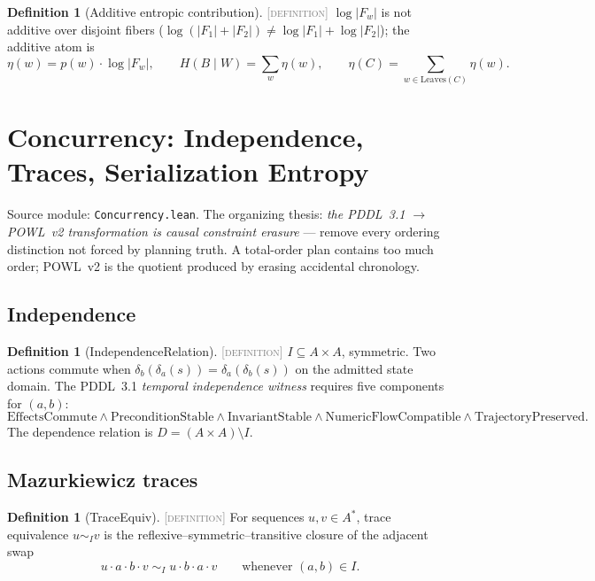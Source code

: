 \documentclass[11pt]{article}
\newcommand{\DEFINITION}{\textcolor{gray}{\textsc{[definition]}}}
\newcommand{\fib}[1]{F_{#1}}                   %
\newcommand{\traceEq}[1]{\sim_{#1}}            %
\theoremstyle{plain}
\theoremstyle{definition}
\newtheorem{definition}[theorem]{Definition}
\begin{document}
\begin{definition}[Additive entropic contribution]\DEFINITION\;
$\log|\fib{w}|$ is not additive over disjoint fibers
($\log(|F_1| + |F_2|) \ne \log|F_1| + \log|F_2|$); the additive atom is
\[
  \eta(w) = p(w)\cdot \log|\fib{w}|,
  \qquad
  H(B \mid W) = \sum_{w} \eta(w),
  \qquad
  \eta(C) = \sum_{w \in \mathrm{Leaves}(C)} \eta(w).
\]
\end{definition}

\section{Concurrency: Independence, Traces, Serialization Entropy}
\label{sec:concurrency}
Source module: \texttt{Concurrency.lean}. The organizing thesis:
\emph{the PDDL~3.1 $\to$ POWL~v2 transformation is causal constraint
erasure} --- remove every ordering distinction not forced by planning truth.
A total-order plan contains too much order; POWL~v2 is the quotient produced
by erasing accidental chronology.

\subsection{Independence}

\begin{definition}[IndependenceRelation]\DEFINITION\;
$I \subseteq A \times A$, symmetric. Two actions commute when
$\delta_b(\delta_a(s)) = \delta_a(\delta_b(s))$ on the admitted state
domain. The PDDL~3.1 \emph{temporal independence witness} requires five
components for $(a,b)$:
\[
  \mathrm{EffectsCommute} \wedge
  \mathrm{PreconditionStable} \wedge
  \mathrm{InvariantStable} \wedge
  \mathrm{NumericFlowCompatible} \wedge
  \mathrm{TrajectoryPreserved}.
\]
The dependence relation is $D = (A \times A) \setminus I$.
\end{definition}

\subsection{Mazurkiewicz traces}

\begin{definition}[TraceEquiv]\DEFINITION\;
For sequences $u, v \in A^{*}$, trace equivalence
$u \traceEq{I} v$ is the reflexive--symmetric--transitive closure of the
adjacent swap
\[
  u \cdot a \cdot b \cdot v \;\traceEq{I}\; u \cdot b \cdot a \cdot v
  \qquad \text{whenever } (a,b) \in I .
\]
\end{definition}
\end{document}
